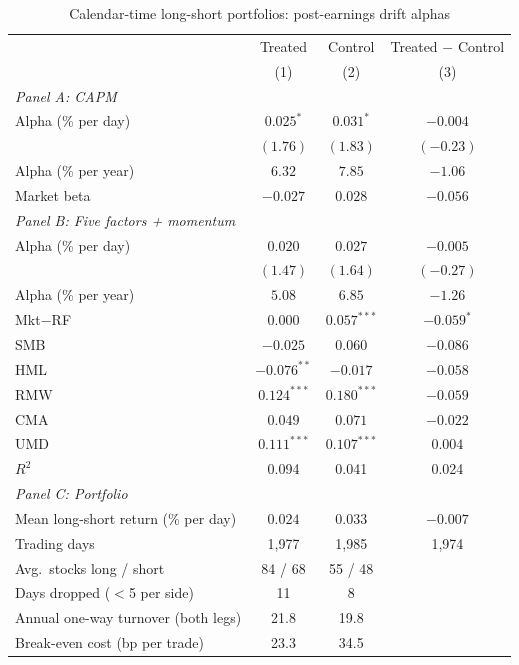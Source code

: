 \begin{table}[htbp]
\centering
\small
\caption{Calendar-time long-short portfolios: post-earnings drift alphas}
\label{tab:alpha}
\begin{tabular}{lccc}
\toprule
 & Treated & Control & Treated $-$ Control \\
 & (1) & (2) & (3) \\
\midrule
\multicolumn{4}{l}{\emph{Panel A: CAPM}} \\
Alpha (\% per day) & $0.025^{*}$ & $0.031^{*}$ & $-0.004$ \\
 & $(1.76)$ & $(1.83)$ & $(-0.23)$ \\
Alpha (\% per year) & $6.32$ & $7.85$ & $-1.06$ \\
Market beta & $-0.027$ & $0.028$ & $-0.056$ \\
\midrule
\multicolumn{4}{l}{\emph{Panel B: Five factors + momentum}} \\
Alpha (\% per day) & $0.020$ & $0.027$ & $-0.005$ \\
 & $(1.47)$ & $(1.64)$ & $(-0.27)$ \\
Alpha (\% per year) & $5.08$ & $6.85$ & $-1.26$ \\
Mkt$-$RF & $0.000$ & $0.057^{***}$ & $-0.059^{*}$ \\
SMB & $-0.025$ & $0.060$ & $-0.086$ \\
HML & $-0.076^{**}$ & $-0.017$ & $-0.058$ \\
RMW & $0.124^{***}$ & $0.180^{***}$ & $-0.059$ \\
CMA & $0.049$ & $0.071$ & $-0.022$ \\
UMD & $0.111^{***}$ & $0.107^{***}$ & $0.004$ \\
$R^2$ & 0.094 & 0.041 & 0.024 \\
\midrule
\multicolumn{4}{l}{\emph{Panel C: Portfolio}} \\
Mean long-short return (\% per day) & $0.024$ & $0.033$ & $-0.007$ \\
Trading days & 1,977 & 1,985 & 1,974 \\
Avg.\ stocks long / short & 84 / 68 & 55 / 48 &  \\
Days dropped ($<$5 per side) & 11 & 8 &  \\
Annual one-way turnover (both legs) & 21.8 & 19.8 &  \\
Break-even cost (bp per trade) & 23.3 & 34.5 &  \\
\bottomrule
\end{tabular}
\par\medskip

\end{table}
